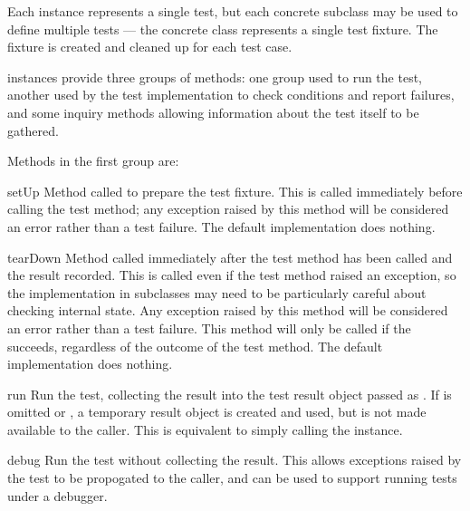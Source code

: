 Each  instance represents a single test, but each
concrete subclass may be used to define multiple tests --- the
concrete class represents a single test fixture.  The fixture is
created and cleaned up for each test case.

 instances provide three groups of methods: one group
used to run the test, another used by the test implementation to
check conditions and report failures, and some inquiry methods
allowing information about the test itself to be gathered.

Methods in the first group are:

\begin{methoddesc}[TestCase]{setUp}{}
  Method called to prepare the test fixture.  This is called
  immediately before calling the test method; any exception raised by
  this method will be considered an error rather than a test failure.
  The default implementation does nothing.
\end{methoddesc}

\begin{methoddesc}[TestCase]{tearDown}{}
  Method called immediately after the test method has been called and
  the result recorded.  This is called even if the test method raised
  an exception, so the implementation in subclasses may need to be
  particularly careful about checking internal state.  Any exception
  raised by this method will be considered an error rather than a test
  failure.  This method will only be called if the 
  succeeds, regardless of the outcome of the test method.
  The default implementation does nothing.  
\end{methoddesc}

\begin{methoddesc}[TestCase]{run}{}
  Run the test, collecting the result into the test result object
  passed as .  If  is omitted or ,
  a temporary result object is created and used, but is not made
  available to the caller.  This is equivalent to simply calling the
   instance.
\end{methoddesc}

\begin{methoddesc}[TestCase]{debug}{}
  Run the test without collecting the result.  This allows exceptions
  raised by the test to be propogated to the caller, and can be used
  to support running tests under a debugger.
\end{methoddesc}


